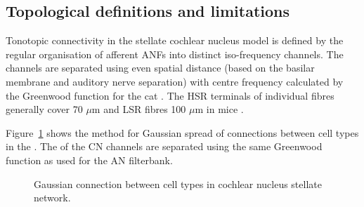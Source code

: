 \subsection{Topological definitions and limitations    \label{sec:CN:tonot-conn}}

Tonotopic connectivity in the stellate cochlear nucleus model is defined by the regular organisation of afferent ANFs into distinct iso-frequency channels.
The channels are separated using even spatial distance (based on the basilar membrane and auditory nerve separation) with centre frequency calculated by the Greenwood function for the cat \citep[see~\ref{tab:ModelSummary},][]{Greenwood:1990}.
The HSR terminals of individual fibres generally cover 70 $\mu$m and LSR fibres 100 $\mu$m in mice \citep{OertelWuEtAl:1988,OertelWu:1989}.


Figure~\ref{fig:CNconn} shows the method for Gaussian spread of connections between cell types in the \CN.
The \CF of the CN channels are separated using the same Greenwood function as used for the AN filterbank.







\begin{figure}[htb]
  \begin{center}
    \caption{Gaussian connection between cell types in cochlear nucleus stellate network.}
    \label{fig:CNconn}
  \end{center}
\end{figure}

